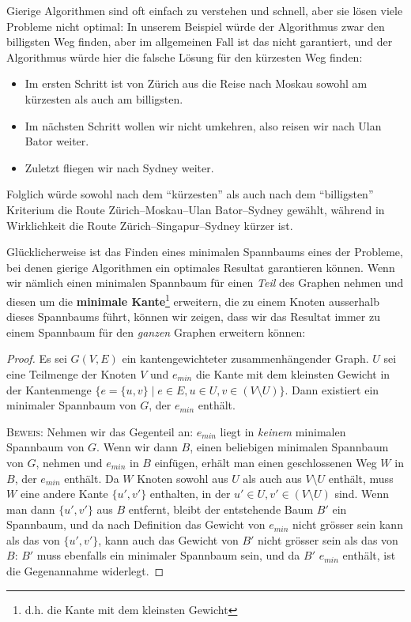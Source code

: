 \documentclass[12pt,a4paper]{report}
\theoremstyle{break}
\theoremstyle{plain}
\newtheorem{proof}{Satz}[chapter]
\begin{document}
Gierige Algorithmen sind oft einfach zu verstehen und schnell, aber
sie l\"{o}sen viele Probleme nicht optimal: In unserem Beispiel
w\"{u}rde der Algorithmus zwar den billigsten Weg finden, aber im
allgemeinen Fall ist das nicht garantiert, und der Algorithmus
w\"{u}rde hier die falsche L\"{o}sung f\"{u}r den k\"{u}rzesten Weg
finden:

\begin{itemize}
\item Im ersten Schritt ist von Z\"{u}rich aus die Reise nach Moskau
  sowohl am k\"{u}rzesten als auch am billigsten.
\item Im n\"{a}chsten Schritt wollen wir nicht umkehren, also reisen
  wir nach Ulan Bator weiter.
\item Zuletzt fliegen wir nach Sydney weiter.
\end{itemize}

Folglich w\"{u}rde sowohl nach dem ``k\"{u}rzesten'' als auch nach dem
``billigsten'' Kriterium die Route Z\"{u}rich--Moskau--Ulan
Bator--Sydney gew\"{a}hlt, w\"{a}hrend in Wirklichkeit die Route
Z\"{u}rich--Singapur--Sydney k\"{u}rzer ist.

Gl\"{u}cklicherweise ist das Finden eines minimalen Spannbaums eines
der Probleme, bei denen gierige Algorithmen ein optimales Resultat
garantieren k\"{o}nnen. Wenn wir n\"{a}mlich einen minimalen Spannbaum 
f\"{u}r einen \emph{Teil} des Graphen nehmen und diesen um die 
\textbf{minimale Kante}\footnote{d.h. die Kante mit dem kleinsten Gewicht}
erweitern, die zu einem Knoten ausserhalb dieses Spannbaums f\"{u}hrt, 
k\"{o}nnen wir zeigen, dass wir das Resultat immer zu einem Spannbaum f\"{u}r
den \emph{ganzen} Graphen erweitern k\"{o}nnen:

\begin{proof}\label{minimalkante}
  Es sei $G(V,E)$ ein kantengewichteter
  zusammenh\"{a}ngender Graph. $U$ sei eine Teilmenge der Knoten $V$ und
  $e_{min}$ die Kante mit dem kleinsten Gewicht in der Kantenmenge
  $\{e=\{u,v\} \mid e\in E, u\in U, v\in (V\!\setminus\!U) \}$. Dann existiert ein
  minimaler Spannbaum von $G$, der $e_{min}$ enth\"{a}lt.

 \bigskip\noindent\textsc{Beweis:} Nehmen wir das Gegenteil an: $e_{min}$
liegt in \emph{keinem} minimalen Spannbaum von $G$. Wenn wir dann $B$,
einen beliebigen minimalen Spannbaum von $G$, nehmen und $e_{min}$ in $B$
einf\"{u}gen, erh\"{a}lt man einen geschlossenen Weg $W$ in $B$, der
$e_{min}$ enth\"{a}lt. Da $W$ Knoten sowohl aus $U$ als auch aus
$V\!\setminus\!U$ enth\"{a}lt, muss $W$ eine andere Kante $\{u', v'\}$
enthalten, in der $u' \in U, v'\in (V\!\setminus\!U)$ sind. Wenn man
dann $\{u',v'\}$ aus $B$ entfernt, bleibt der entstehende Baum $B'$ ein Spannbaum, und da nach
Definition das Gewicht von $e_{min}$ nicht gr\"{o}sser sein kann als
das von $\{u',v'\}$, kann auch das Gewicht von $B'$ nicht
gr\"{o}sser sein als das von $B$: $B'$ muss ebenfalls ein minimaler
Spannbaum sein, und da $B'$ $e_{min}$ enth\"{a}lt, ist die
Gegenannahme widerlegt.
\end{proof} 
\end{document}
